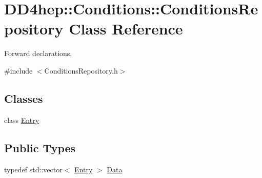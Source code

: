 \hypertarget{class_d_d4hep_1_1_conditions_1_1_conditions_repository}{}\section{D\+D4hep\+:\+:Conditions\+:\+:Conditions\+Repository Class Reference}
\label{class_d_d4hep_1_1_conditions_1_1_conditions_repository}


Forward declarations.  




{\ttfamily \#include $<$Conditions\+Repository.\+h$>$}

\subsection*{Classes}
\begin{DoxyCompactItemize}
\item 
class \hyperlink{class_d_d4hep_1_1_conditions_1_1_conditions_repository_1_1_entry}{Entry}
\end{DoxyCompactItemize}
\subsection*{Public Types}
\begin{DoxyCompactItemize}
\item 
typedef std\+::vector$<$ \hyperlink{class_d_d4hep_1_1_conditions_1_1_conditions_repository_1_1_entry}{Entry} $>$ \hyperlink{class_d_d4hep_1_1_conditions_1_1_conditions_repository_a2a262d14363e0c6879677397dc595012}{Data}
\end{DoxyCompactItemize}
